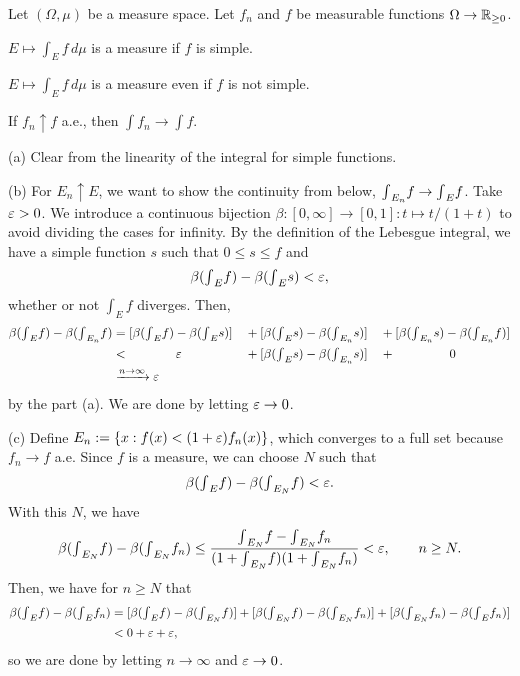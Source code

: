 \documentclass{../../large}
\begin{document}
\begin{prb}
Let $(\Omega,\mu)$ be a measure space.
Let $f_n$ and $f$ be measurable functions $\Omega\to\mathbb{R}_{\ge0}$.
\begin{parts}
\item $E\mapsto\int_Ef\,d\mu$ is a measure if $f$ is simple.
\item $E\mapsto\int_Ef\,d\mu$ is a measure even if $f$ is not simple.
\item If $f_n\uparrow f$ a.e., then $\int f_n\to\int f$.
\end{parts}
\end{prb}
\begin{pf}
(a)
Clear from the linearity of the integral for simple functions.

(b)
For $E_n\uparrow E$, we want to show the continuity from below, ${\textstyle\int}_{E_n}f\to{\textstyle\int}_Ef$.
Take $\varepsilon>0$.
We introduce a continuous bijection $\beta:[0,\infty]\to[0,1]:t\mapsto t/(1+t)$ to avoid dividing the cases for infinity.
By the definition of the Lebesgue integral, we have a simple function $s$ such that $0\le s\le f$ and
\[\beta({\textstyle\int}_Ef)-\beta({\textstyle\int}_Es)<\varepsilon,\]
whether or not $\int_Ef$ diverges.
Then,
\begin{alignat*}{4}
\beta(\tint_Ef)-\beta(\tint_{E_n}f)
&=[\beta(\tint_Ef)-\beta(\tint_Es)]
&&+[\beta(\tint_Es)-\beta(\tint_{E_n}s)]
&&+[\beta(\tint_{E_n}s)-\beta(\tint_{E_n}f)]\\
&\ccol{<}{\e}
&&+[\beta(\tint_Es)-\beta(\tint_{E_n}s)]
&&\ccol{+}{0}\\
&\xrightarrow{n\to\infty}\e
\end{alignat*}
by the part (a).
We are done by letting $\varepsilon\to0$.

(c)
Define $E_n:=\{x:f(x)<(1+\varepsilon)f_n(x)\}$,
which converges to a full set because $f_n\to f$ a.e.
Since $f$ is a measure, we can choose $N$ such that
\[\beta({\textstyle\int}_Ef)-\beta({\textstyle\int}_{E_N}f)<\varepsilon.\]
With this $N$, we have
\[\beta({\textstyle\int}_{E_N}f)-\beta({\textstyle\int}_{E_N}f_n)\le\frac{{\textstyle\int}_{E_N}f-{\textstyle\int}_{E_N}f_n}{(1+{\textstyle\int}_{E_N}f)(1+{\textstyle\int}_{E_N}f_n)}<\varepsilon,\qquad n\ge N.\]
Then, we have for $n\ge N$ that
\begin{align*}
\beta({\textstyle\int}_Ef)-\beta({\textstyle\int}_Ef_n)
&=[\beta({\textstyle\int}_Ef)-\beta({\textstyle\int}_{E_N}f)]+[\beta({\textstyle\int}_{E_N}f)-\beta({\textstyle\int}_{E_N}f_n)]+[\beta({\textstyle\int}_{E_N}f_n)-\beta({\textstyle\int}_{E}f_n)]\\
&<0+\varepsilon+\varepsilon,
\end{align*}
so we are done by letting $n\to\infty$ and $\varepsilon\to0$.
\end{pf}
\end{document}
